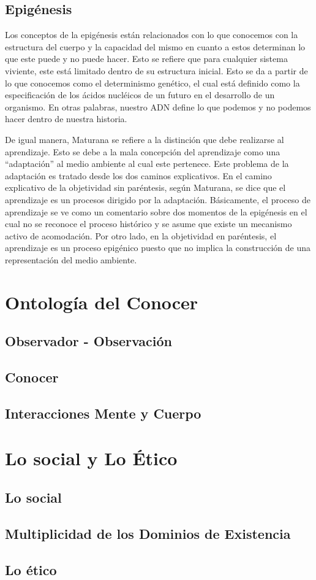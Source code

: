 \documentclass[10pt]{article}
\begin{document}
        \subsection{Epigénesis}

        Los conceptos de la epigénesis están relacionados con lo que conocemos con la estructura del cuerpo y la capacidad del mismo en cuanto a estos determinan lo que este puede y no puede hacer.  Esto se refiere que para cualquier sistema viviente, este está limitado dentro de su estructura inicial. Esto se da a partir de lo que conocemos como el determinismo genético, el cual está definido como la especificación de los ácidos nucléicos de un futuro en el desarrollo de un organismo. En otras palabras, nuestro ADN define lo que podemos y no podemos hacer dentro de nuestra historia.

        De igual manera, Maturana se refiere a la distinción que debe realizarse al aprendizaje. Esto se debe a la mala concepción del aprendizaje como una ``adaptación'' al medio ambiente al cual este pertenece. Este problema de la adaptación es tratado desde los dos caminos explicativos. En el camino explicativo de la objetividad sin paréntesis, según Maturana, se dice que el aprendizaje es un procesos dirigido por la adaptación. Básicamente, el proceso de aprendizaje se ve como un comentario sobre dos momentos de la epigénesis en el cual no se reconoce el proceso histórico y se asume que existe un mecanismo activo de acomodación. Por otro lado, en la objetividad en paréntesis, el aprendizaje es un proceso epigénico puesto que no implica la construcción de una representación del medio ambiente.

    \section{Ontología del Conocer}

        \subsection{Observador - Observación}

        \subsection{Conocer}

        \subsection{Interacciones Mente y Cuerpo}

    \section{Lo social y Lo Ético}

        \subsection{Lo social}

        \subsection{Multiplicidad de los Dominios de Existencia}

        \subsection{Lo ético}
\end{document}
